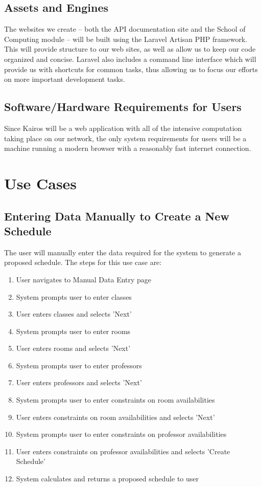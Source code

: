 \documentclass{extarticle}
\begin{document}
\subsection{Assets and Engines}
The websites we create -- both the API documentation site and the School of Computing module -- will be built using
the Laravel Artisan PHP framework.  This will provide structure to our web sites, as well as allow us to keep our
code organized and concise.  Laravel also includes a command line interface which will provide us with shortcuts
for common tasks, thus allowing us to focus our efforts on more important development tasks.

\subsection{Software/Hardware Requirements for Users}
Since Kairos will be a web application with all of the intensive computation taking place on our network, the only
system requirements for users will be a machine running a modern browser with a reasonably fast internet connection.

\newpage

\appendix
\section{Use Cases}

\subsection{Entering Data Manually to Create a New Schedule}
The user will manually enter the data required for the system to generate a proposed schedule.  The steps for this
use case are:

\begin{enumerate}
\item User navigates to Manual Data Entry page
\item System prompts user to enter classes
\item User enters classes and selects 'Next'
\item System prompts user to enter rooms
\item User enters rooms and selects 'Next'
\item System prompts user to enter professors
\item User enters professors and selects 'Next'
\item System prompts user to enter constraints on room availabilities
\item User enters constraints on room availabilities and selects 'Next'
\item System prompts user to enter constraints on professor availabilities
\item User enters constraints on professor availabilities and selects 'Create Schedule'
\item System calculates and returns a proposed schedule to user
\end{enumerate}
\end{document}
